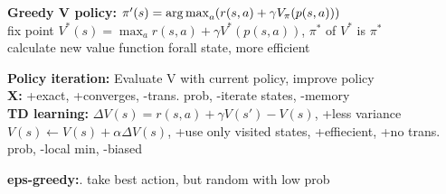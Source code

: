 \textbf{Greedy V policy:} $\pi'(s) = \operatorname*{arg\,max}_a(r(s,a) + \gamma V_\pi(p(s,a)))$\\
fix point $V^*(s) = \max_a r(s,a) + \gamma V^*(p(s,a))$, $\pi^*$ of $V^*$ is $\pi^*$\\
calculate new value function forall state, more efficient\\

\textbf{Policy iteration:} Evaluate V with current policy, improve policy\\

\textbf{X:} +exact, +converges, -trans. prob, -iterate states, -memory\\

\textbf{TD learning:} $\Delta V(s) = r(s,a) + \gamma V(s') - V(s)$, +less variance\\
$V(s) \leftarrow V(s) + \alpha \Delta V(s)$, +use only visited states, +effiecient, +no trans. prob, -local min, -biased\\

\textbf{eps-greedy:}. take best action, but random with low prob\\

